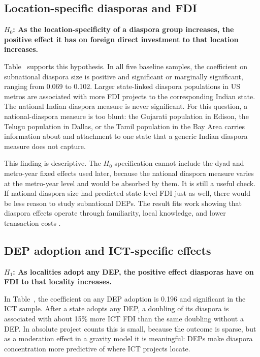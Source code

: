 \documentclass[12pt]{article}
\let\oldsubsection\subsection
\renewcommand{\subsection}{\FloatBarrier\oldsubsection}
\begin{document}
\subsection{Location-specific diasporas and FDI}

\textbf{$H_0$: As the location-specificity of a diaspora group increases, the positive effect it has on foreign direct investment to that location increases.}

Table~ supports this hypothesis. In all five baseline samples, the coefficient on subnational diaspora size is positive and significant or marginally significant, ranging from 0.069 to 0.102. Larger state-linked diaspora populations in US metros are associated with more FDI projects to the corresponding Indian state. The national Indian diaspora measure is never significant. For this question, a national-diaspora measure is too blunt: the Gujarati population in Edison, the Telugu population in Dallas, or the Tamil population in the Bay Area carries information about and attachment to one state that a generic Indian diaspora measure does not capture.

This finding is descriptive. The $H_0$ specification cannot include the dyad and metro-year fixed effects used later, because the national diaspora measure varies at the metro-year level and would be absorbed by them. It is still a useful check. If national diaspora size had predicted state-level FDI just as well, there would be less reason to study subnational DEPs. The result fits work showing that diaspora effects operate through familiarity, local knowledge, and lower transaction costs \citep{leblang_familiarity_2010, kugler_migration_2018, useche_highly_2020}.

\subsection{DEP adoption and ICT-specific effects}

\textbf{$H_1$: As localities adopt any DEP, the positive effect diasporas have on FDI to that locality increases.}

In Table~, the coefficient on any DEP adoption is 0.196 and significant in the ICT sample. After a state adopts any DEP, a doubling of its diaspora is associated with about 15\% more ICT FDI than the same doubling without a DEP. In absolute project counts this is small, because the outcome is sparse, but as a moderation effect in a gravity model it is meaningful: DEPs make diaspora concentration more predictive of where ICT projects locate.
\end{document}
